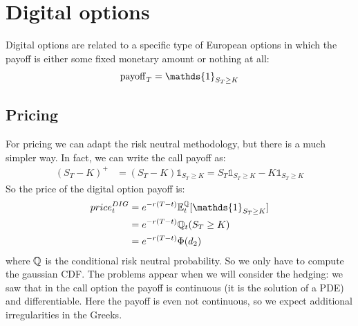 \section{Digital options}
Digital options are related to a specific type of European options in which the payoff is either some fixed monetary amount or nothing at all:
\begin{equation}
    \pay_T = \mathds{1}_{S_T\ge K}
\end{equation}

\subsection{Pricing}
For pricing we can adapt the risk neutral methodology, but there is a much simpler way. In fact, we can write the call payoff as:
\begin{align}
    (S_T-K)^+ &= (S_T-K)\mathds{1}_{S_T\ge K} = S_T\mathds{1}_{S_T\ge K} - K\mathds{1}_{S_T\ge K}
\end{align}
So the price of the digital option payoff is:
\begin{align}
    \notag price^{DIG}_t &= e^{-r(T-t)}\expect_t[\mathds{1}_{S_T\ge K}] \\
    &=
    \notag e^{-r(T-t)}\Qmeas_t(S_T\ge K) \\
    &=
    e^{-r(T-t)}\Phi(d_2)
\end{align}
where $\mathbb{Q}$ is the conditional risk neutral probability. So we only have to compute the gaussian CDF. The problems appear when we will consider the hedging: we saw that in the call option the payoff is continuous (it is the solution of a PDE) and differentiable. Here the payoff is even not continuous, so we expect additional irregularities in the Greeks. 

